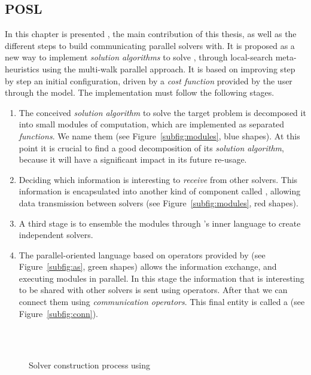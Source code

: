 \subsection{POSL}

In this chapter is presented \posl{}, the main contribution of this thesis, as well as the different steps to build communicating parallel solvers with. It is proposed as a new way to implement \textit{solution algorithms} to solve \CSPs, through local-search meta-heuristics using the multi-walk parallel approach. It is based on improving step by step an initial configuration, driven by a \textit{cost function} provided by the user through the model. The implementation must follow the following stages.

\begin{enumerate}
\item The conceived \textit{solution algorithm} to solve the target problem is decomposed it into small modules of computation, which are implemented as separated {\it functions}. We name them \oms{} (see Figure~\ref{subfig:modules}, blue shapes). At this point it is crucial to find a good decomposition of its \textit{solution algorithm}, because it will have a significant impact in its future re-usage. 
\item Deciding which information is interesting to \textit{receive} from other solvers. This information is encapsulated into another kind of component called \opch, allowing data transmission between solvers (see Figure~\ref{subfig:modules}, red shapes).
\item A third stage is to ensemble the modules through \posl{}'s inner language %
to create independent solvers.
\item The parallel-oriented language based on operators provided by \posl{} (see Figure~\ref{subfig:as}, green shapes) allows the information exchange, and executing modules in parallel. In this stage the information that is interesting to be shared with other solvers is sent using operators. After that we can connect them using {\it communication operators}. This final entity is called a \INTROsoset{} (see Figure~\ref{subfig:conn}).
\end{enumerate}

\begin{figure}[h]
	\centering
	\\
	\\
	\caption[]{Solver construction process using \posl}
	\label{fig:posl}
\end{figure}

